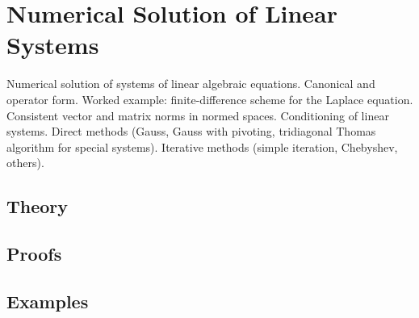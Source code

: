 
\section{Numerical Solution of Linear Systems}
\label{sec:2.1.06-linear-systems-numerical}

\begin{ticket}
Numerical solution of systems of linear algebraic equations. Canonical and operator form. Worked example: finite-difference scheme for the Laplace equation. Consistent vector and matrix norms in normed spaces. Conditioning of linear systems. Direct methods (Gauss, Gauss with pivoting, tridiagonal Thomas algorithm for special systems). Iterative methods (simple iteration, Chebyshev, others).
\end{ticket}

\subsection*{Theory}

\subsection*{Proofs}

\subsection*{Examples}
